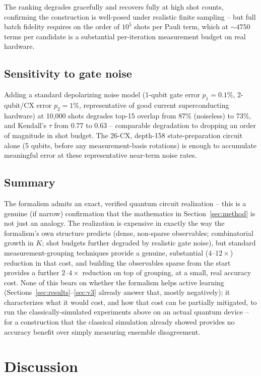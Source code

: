 \documentclass[conference]{IEEEtran}
\begin{document}
The ranking degrades gracefully and recovers fully at high shot counts, confirming the construction is well-posed under realistic finite sampling -- but full batch fidelity requires on the order of $10^5$ shots per Pauli term, which at $\sim\!4750$ terms per candidate is a substantial per-iteration measurement budget on real hardware.

\subsection{Sensitivity to gate noise}

Adding a standard depolarizing noise model (1-qubit gate error $p_1=0.1\%$, 2-qubit/CX error $p_2=1\%$, representative of good current superconducting hardware) at 10,000 shots degrades top-15 overlap from 87\% (noiseless) to 73\%, and Kendall's $\tau$ from 0.77 to 0.63 -- comparable degradation to dropping an order of magnitude in shot budget. The 26-CX, depth-158 state-preparation circuit alone (5 qubits, before any measurement-basis rotations) is enough to accumulate meaningful error at these representative near-term noise rates.

\subsection{Summary}

The formalism admits an exact, verified quantum circuit realization -- this is a genuine (if narrow) confirmation that the mathematics in Section~\ref{sec:method} is not just an analogy. The realization is expensive in exactly the way the formalism's own structure predicts (dense, non-sparse observables; combinatorial growth in $K$; shot budgets further degraded by realistic gate noise), but standard measurement-grouping techniques provide a genuine, substantial ($4$--$12\times$) reduction in that cost, and building the observables sparse from the start provides a further $2$--$4\times$ reduction on top of grouping, at a small, real accuracy cost. None of this bears on whether the formalism helps active learning (Sections~\ref{sec:results}--\ref{sec:v3} already answer that, mostly negatively); it characterizes what it would cost, and how that cost can be partially mitigated, to run the classically-simulated experiments above on an actual quantum device -- for a construction that the classical simulation already showed provides no accuracy benefit over simply measuring ensemble disagreement.

\section{Discussion}
\end{document}
